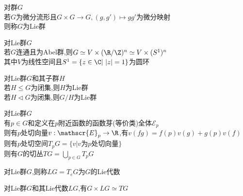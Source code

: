 

%

\setcounter{section}{0}
\setcounter{subsection}{0}

\begin{dingyi}
对群$G$\\
若$G$为微分流形且$G\times G\to G,(g,g')\mapsto gg'$为微分映射\\
则称$G$为Lie群
\end{dingyi}

\begin{dingli}
对Lie群$G$\\
若$G$连通且为Abel群,则$G\simeq V\times (\R/\Z)^n\simeq V\times (S^{1})^n$\\
其中$V$为线性空间且$S^{1}=\{z\in \C|\ |z|=1\}$为圆环
\end{dingli}

\begin{dingli}
对Lie群$G$和其子群$H$\\
若$H\leq G$为闭集,则$H$为Lie群\\
若$H\lhd G$为闭集,则$G/H$为Lie群
\end{dingli}

\begin{dingyi}
对Lie群$G$\\
有$p\in G$和定义在$p$附近函数的函数芽(等价类)全体$\mathscr{E}_{p}$\\
则有$p$处切向量$v:\mathscr{E}_{p}\to \R$,有$v(fg)=f(p)v(g)+g(p)v(f)$\\
则有$p$处切空间$T_{p}G=\{v|v\text{为}p\text{处切向量}\}$\\
则有$G$的切丛$TG=\bigcup\limits_{p\in G}T_{p}G$
\end{dingyi}

\begin{dingyi}
对Lie群$G$,则称$LG=T_{e}G$为$G$的Lie代数
\end{dingyi}

\begin{dingli}
对Lie群$G$和其Lie代数$LG$,有$G\times LG\simeq TG$
\end{dingli}

